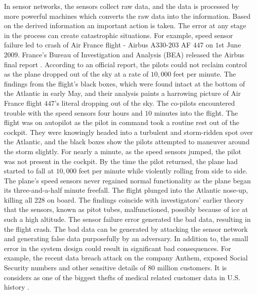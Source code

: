 	In sensor networks, the sensors collect raw data, and the data is processed by more powerful machines which converts the raw data into the information.
	Based on the derived information an important action is taken.
	The error at any stage in the process can create catastrophic situations.
	For example, speed sensor failure led to crash of Air France flight - Airbus A$330$-$203$ AF $447$ on $1$st June $2009$.
	France's Bureau of Investigation and Analysis (BEA) released the Airbus final report \cite{final-report}.
	According to an official report, the pilots could not reclaim control as the plane dropped out of the sky at a rate of $10,000$ feet per minute.
	The findings from the flight's black boxes, which were found intact at the bottom of the Atlantic in early May, and their analysis paints a harrowing picture of Air France flight $447$'s literal dropping out of the sky.
	The co-pilots encountered trouble with the speed sensors four hours and $10$ minutes into the flight. 
	The flight was on autopilot as the pilot in command took a routine rest out of the cockpit. 
	They were knowingly headed into a turbulent and storm-ridden spot over the Atlantic, and the black boxes show the pilots attempted to maneuver around the storm slightly.
	For nearly a minute, as the speed sensors jumped, the pilot was not present in the cockpit. 
	By the time the pilot returned, the plane had started to fall at $10,000$ feet per minute while violently rolling from side to side.
	The plane's speed sensors never regained normal functionality as the plane began its three-and-a-half minute freefall.
	The flight plunged into the Atlantic nose-up, killing all 228 on board.
	The findings coincide with investigators' earlier theory that the sensors, known as pitot tubes, malfunctioned, possibly because of ice at such a high altitude.
	The sensor failure error generated the bad data, resulting in the flight crash.
	The bad data can be generated by attacking the sensor network and generating false data purposefully by an adversary. 
	In addition to, the small error in the system design could result in significant bad consequences.
	For example, the recent data breach attack on the company Anthem, exposed Social Security numbers and other sensitive details of 80 million customers.
	It is considers as one of the biggest thefts of medical related customer data in U.S. history \cite{anthem}.

